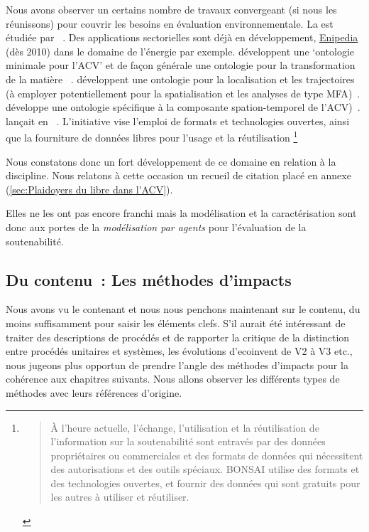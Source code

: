 Nous avons observer un certains nombre de travaux convergeant (si nous les réunissons) pour couvrir les besoins en évaluation environnementale.
La  est étudiée par \citeauthor{bertin_modelisation_2013}~\cite{bertin_modelisation_2013}.
Des applications sectorielles sont déjà en développement,
\href{http://enipedia.tudelft.nl/wiki/Main_Page}{Enipedia} (dès 2010) dans le domaine de l'énergie par exemple.
\citeauthor{vardeman_ontology_2015} développent une `ontologie minimale pour l'ACV' et de façon générale une ontologie pour la transformation de la matière ~\cite{vardeman_minimal_????,vardeman_ontology_2015}.
\citeauthor{hu_geo-ontology_2013} développent une ontologie pour la localisation et les trajectoires (à employer potentiellement pour la spatialisation et les analyses de type \gls{MFA})~\cite{hu_geo-ontology_2013}.
\citeauthor{yan_ontology_2015} développe une ontologie spécifique à la composante spation-temporel de l'\gls{ACV})~\cite{yan_ontology_2015}.
\citeauthor{weidema_bonsai_2014} lançait en \citeyear{weidema_bonsai_2014} ~\cite{weidema_bonsai_2014}.
L'initiative vise l'emploi de formats et technologies ouvertes, ainsi que la fourniture de données libres pour l'usage et la réutilisation
\footnote{
\blockcquote[traduction]{weidema_bonsai_2014}{
À l'heure actuelle, l'échange, l'utilisation et la réutilisation de l'information sur la soutenabilité sont entravés par des données propriétaires ou commerciales et des formats de données qui nécessitent des autorisations et des outils spéciaux.
BONSAI utilise des formats et des technologies ouvertes, et fournir des données qui sont gratuits pour les autres à utiliser et réutiliser.
}
}

Nous constatons donc un fort développement de ce domaine en relation à la discipline.
Nous relatons à cette occasion un recueil de citation placé en annexe (\ref{sec:Plaidoyers du libre dans l'ACV}).

Elles ne les ont pas encore franchi mais la modélisation et la caractérisation sont donc aux portes de la \emph{modélisation par agents} pour l'évaluation de la soutenabilité.
\subsection{Du contenu~: Les méthodes d'impacts}
\label{sec:LCIAM}
Nous avons vu le contenant et nous nous penchons maintenant sur le contenu, du moins suffisamment pour saisir les éléments clefs.
S'il aurait été intéressant de traiter des descriptions de procédés et de rapporter la critique de la distinction entre procédés unitaires et systèmes, les évolutions d'ecoinvent de V2 à V3 etc., nous jugeons plus opportun de prendre l'angle des méthodes d'impacts pour la cohérence aux chapitres suivants.
Nous allons observer les différents types de méthodes avec leurs références d'origine.
